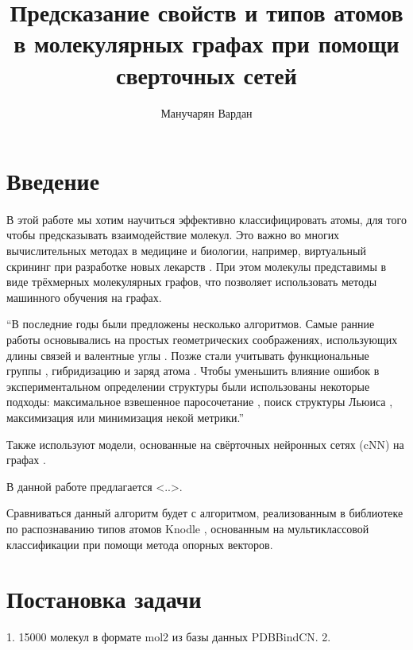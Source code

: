 \documentclass[12pt,twoside]{article}
\title
    [] %
    {Предсказание свойств и типов атомов в молекулярных графах при помощи сверточных сетей}
\author
    [] %
    {Манучарян Вардан} %
    [Манучарян Вардан] %
\begin{document}
\maketitle
\section{Введение}
\paragraph{}
	В этой работе мы хотим научиться эффективно классифицировать атомы, для того чтобы предсказывать взаимодействие молекул. Это важно во многих вычислительных методах в медицине и биологии, например, виртуальный скрининг при разработке новых лекарств \cite{article2}. При этом молекулы представимы в виде трёхмерных молекулярных графов, что позволяет использовать методы машинного обучения на графах.
	
	“В последние годы были предложены несколько алгоритмов. Самые ранние работы основывались на простых геометрических соображениях, использующих длины связей и валентные углы \cite{article3}. Позже стали учитывать функциональные группы \cite{article4}, гибридизацию и заряд атома \cite{article5,article6,article7,article8}. Чтобы уменьшить влияние ошибок в экспериментальном определении структуры были использованы некоторые подходы: максимальное взвешенное паросочетание \cite{article9,article10}, поиск структуры Льюиса \cite{article11}, максимизация \cite{article12} или минимизация \cite{article13,article14} некой метрики.”
	
	Также используют модели, основанные на свёрточных нейронных сетях (cNN) на графах \cite{article15,article16}.
	
	В данной работе предлагается <..>.
	
	Сравниваться данный алгоритм будет с алгоритмом, реализованным в библиотеке по распознаванию типов атомов Knodle \cite{article1}, основанным на мультиклассовой классификации при помощи метода опорных векторов.
	
\section{Постановка задачи}
1. 15000 молекул в формате mol2 из базы данных PDBBindCN.
2. 
\end{document}
